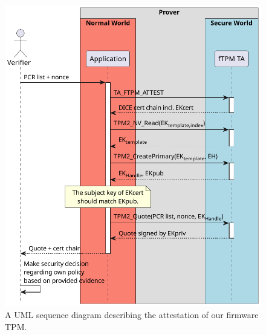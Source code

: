 \begin{figure}[htb]
  \centering
  \includegraphics[width=0.74\linewidth]{figures/tpm-attestation.pdf}
  \caption{A UML sequence diagram describing the attestation of our firmware TPM\@.}\label{fig:ftpm_attestation}
\end{figure}
